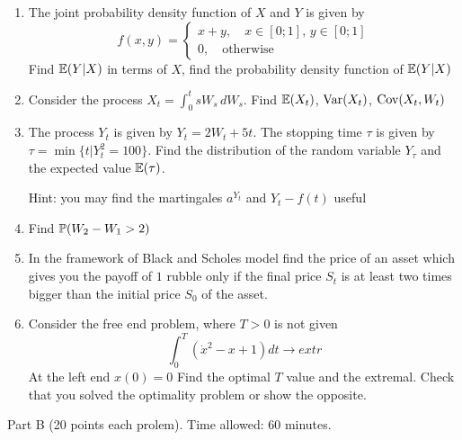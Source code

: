 \documentclass[12pt, a4paper]{article}
\begin{document}
\begin{enumerate}
\item The joint probability density function of $X$ and $Y$ is given by
\begin{equation}
f(x,y)=\begin{cases}
x+y, \quad x\in[0;1],\, y\in [0;1] \\
0, \quad \mbox{otherwise}
\end{cases} \nonumber
\end{equation}
Find $\E(Y|X)$ in terms of $X$, find the probability density function of  $\E(Y|X)$
\item Consider the process $X_t=\int_0^t sW_s\,dW_s$. Find $\E(X_t)$, $\Var(X_t)$, $\Cov(X_t,W_t)$
\item The process $Y_t$ is given by $Y_t=2W_t+5t$. The stopping time $\tau$ is given by $\tau=\min\{t|Y_t^2=100\}$. Find the distribution of the random variable $Y_\tau$ and the expected value $\E(\tau)$.


Hint: you may find the martingales $a^{Y_t}$ and $Y_t-f(t)$ useful
\item Find $\P(W_2-W_1>2)$
\item In the framework of Black and Scholes model find the price of an asset which gives you the payoff of $1$ rubble only if the final price $S_t$ is at least two times bigger than the initial price $S_0$ of the asset.
\item Consider the free end problem, where $T>0$ is not given
\begin{equation}
\int_0^T (\dot{x}^2-x+1)dt \to extr \nonumber
\end{equation}
At the left end $x(0)=0$
Find the optimal $T$ value and the extremal. Check that you solved the optimality problem or show the opposite.
\end{enumerate}

Part B (20 points each prolem). Time allowed: 60 minutes.
\end{document}
